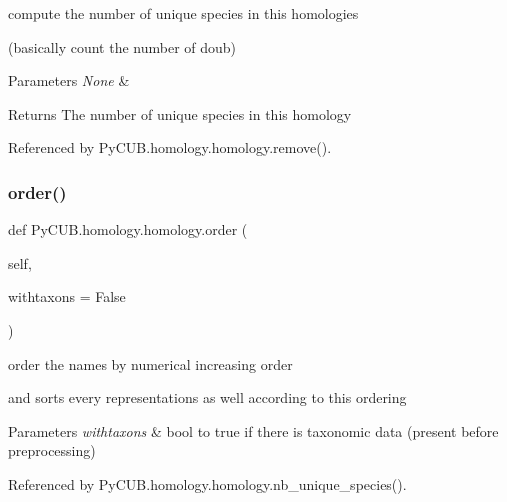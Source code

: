 compute the number of unique species in this homologies 

(basically count the number of doub)


\begin{DoxyParams}{Parameters}
{\em None} & \\
\hline
\end{DoxyParams}
\begin{DoxyReturn}{Returns}
The number of unique species in this homology 
\end{DoxyReturn}


Referenced by Py\+C\+U\+B.\+homology.\+homology.\+remove().

\mbox{\label{class_py_c_u_b_1_1homology_1_1homology_a513d82c775ba47678304c97572eaf932}} 
\subsubsection{\texorpdfstring{order()}{order()}}
{\footnotesize\ttfamily def Py\+C\+U\+B.\+homology.\+homology.\+order (\begin{DoxyParamCaption}\item[{}]{self,  }\item[{}]{withtaxons = {\ttfamily False} }\end{DoxyParamCaption})}



order the names by numerical increasing order 

and sorts every representations as well according to this ordering


\begin{DoxyParams}{Parameters}
{\em withtaxons} & bool to true if there is taxonomic data (present before preprocessing) \\
\hline
\end{DoxyParams}


Referenced by Py\+C\+U\+B.\+homology.\+homology.\+nb\+\_\+unique\+\_\+species().

\mbox{\label{class_py_c_u_b_1_1homology_1_1homology_a1a3802095c2ea6f426e803b055a2aea9}} 
